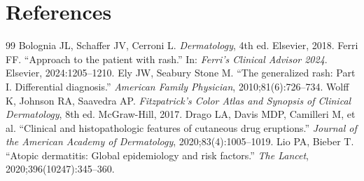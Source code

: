 \section*{References}
\begin{thebibliography}{99}
 Bolognia JL, Schaffer JV, Cerroni L. \textit{Dermatology}, 4th ed. Elsevier, 2018.
 Ferri FF. ``Approach to the patient with rash.'' In: \textit{Ferri's Clinical Advisor 2024}. Elsevier, 2024:1205--1210.
 Ely JW, Seabury Stone M. ``The generalized rash: Part I. Differential diagnosis.'' \textit{American Family Physician}, 2010;81(6):726--734.
 Wolff K, Johnson RA, Saavedra AP. \textit{Fitzpatrick's Color Atlas and Synopsis of Clinical Dermatology}, 8th ed. McGraw-Hill, 2017.
 Drago LA, Davis MDP, Camilleri M, et al. ``Clinical and histopathologic features of cutaneous drug eruptions.'' \textit{Journal of the American Academy of Dermatology}, 2020;83(4):1005--1019.
 Lio PA, Bieber T. ``Atopic dermatitis: Global epidemiology and risk factors.'' \textit{The Lancet}, 2020;396(10247):345--360.
\end{thebibliography}
